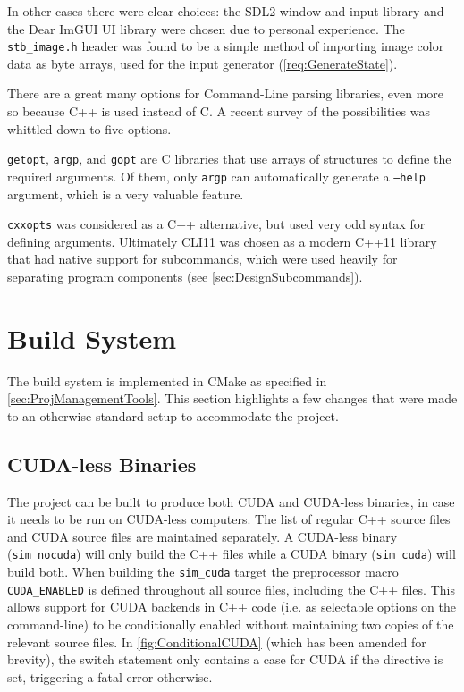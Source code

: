 In other cases there were clear choices: the SDL2\cite{SimpleHomepage} window and input library and the Dear ImGUI\cite{CornutDearImGui} UI library were chosen due to personal experience.
The \texttt{stb\_image.h} header was found to be a simple method of importing image color data as byte arrays, used for the input generator (\cref{req:GenerateState}).

There are a great many options for Command-Line parsing libraries, even more so because C++ is used instead of C.
A recent survey of the possibilities\cite{attractivechaos2018AC/C++} was whittled down to five options.

\texttt{getopt}\cite{FreeSoftwareFoundationGetopt3:Page}, \texttt{argp}\cite{GNUProjectArgpLibrary}, and \texttt{gopt}\cite{VajzovicGoptLibrary} are C libraries that use arrays of structures to define the required arguments.
Of them, only \texttt{argp} can automatically generate a \texttt{--help} argument, which is a very valuable feature.

\texttt{cxxopts}\cite{jarro2783Cxxopts:Parser} was considered as a C++ alternative, but used very odd syntax for defining arguments.
Ultimately CLI11\cite{CLIUtilsCLI11} was chosen as a modern C++11 library that had native support for subcommands, which were used heavily for separating program components (see \cref{sec:DesignSubcommands}).

\section{Build System}
The build system is implemented in CMake\cite{tool:Cmake} as specified in \cref{sec:ProjManagementTools}.
This section highlights a few changes that were made to an otherwise standard setup to accommodate the project.

\subsection{CUDA-less Binaries}
The project can be built to produce both CUDA and CUDA-less binaries, in case it needs to be run on CUDA-less computers.
The list of regular C++ source files and CUDA source files are maintained separately. A CUDA-less binary (\texttt{sim\_nocuda}) will only build the C++ files while a CUDA binary (\texttt{sim\_cuda}) will build both.
When building the \texttt{sim\_cuda} target the preprocessor macro \texttt{CUDA\_ENABLED} is defined throughout all source files, including the C++ files.
This allows support for CUDA backends in C++ code (i.e. as selectable options on the command-line) to be conditionally enabled without maintaining two copies of the relevant source files.
In \cref{fig:ConditionalCUDA} (which has been amended for brevity), the switch statement only contains a case for CUDA if the directive is set, triggering a fatal error otherwise.



